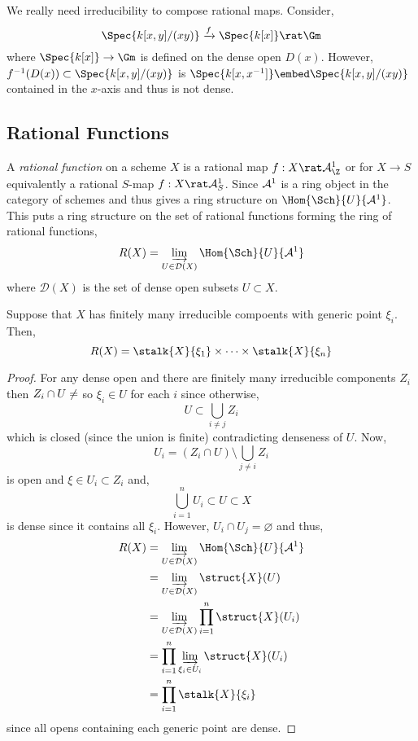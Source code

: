 \documentclass[12pt]{article}
\begin{document}
\begin{remark}
We really need irreducibility to compose rational maps. Consider,
\[ \Spec{k[x,y]/(xy)} \xrightarrow{f} \Spec{k[x]} \rat \Gm \]
where $\Spec{k[x]} \to \Gm$ is defined on the dense open $D(x)$. However, $f^{-1}(D(x)) \subset \Spec{k[x,y]/(xy)}$ is $\Spec{k[x, x^{-1}]} \embed \Spec{k[x,y]/(xy)}$ contained in the $x$-axis and thus is not dense.
\end{remark}

\subsection{Rational Functions}

\begin{definition}
A \textit{rational function} on a scheme $X$ is a rational map $f : X \rat \A^1_\Z$ or for $X \to S$ equivalently a rational $S$-map $f : X \rat \A^1_S$. Since $\mathcal{A}^1$ is a ring object in the category of schemes and thus gives a ring structure on $\Hom{\Sch}{U}{\A^1}$. This puts a ring structure on the set of rational functions forming the ring of rational functions,
\[ R(X) = \varinjlim_{U \in \mathcal{D}(X)} \Hom{\Sch}{U}{\A^1} \]
where $\mathcal{D}(X)$ is the set of dense open subsets $U \subset X$.
\end{definition}

\begin{prop}
Suppose that $X$ has finitely many irreducible compoents with generic point $\xi_i$. Then,
\[ R(X) = \stalk{X}{\xi_1} \times \cdots \times \stalk{X}{\xi_n} \]
\end{prop}

\begin{proof}
For any dense open and there are finitely many irreducible components $Z_i$ then $Z_i \cap U \neq \empty$ so $\xi_i \in U$ for each $i$ since otherwise,
\[ U \subset \bigcup_{i \neq j} Z_i \]
which is closed (since the union is finite) contradicting denseness of $U$. Now,
\[ U_i = (Z_i \cap U) \setminus \bigcup_{j \neq i} Z_i \]
is open and $\xi \in U_i \subset Z_i$ and,
\[ \bigcup_{i = 1}^n U_i \subset U \subset X \]
is dense since it contains all $\xi_i$. However, $U_i \cap U_j = \varnothing$ and thus,
\begin{align*}
R(X) & = \varinjlim_{U \in \mathcal{D}(X)} \Hom{\Sch}{U}{\A^1}
\\
& = \varinjlim_{U \in \mathcal{D}(X)} \struct{X}(U)
\\
& = \varinjlim_{U \in \mathcal{D}(X)} \prod_{i = 1}^n \struct{X}(U_i)
\\
& = \prod_{i = 1}^n \varinjlim_{\xi_i \in U_i} \struct{X}(U_i)
\\
& = \prod_{i = 1}^n \stalk{X}{\xi_i} 
\end{align*}
since all opens containing each generic point are dense.
\end{proof}
\end{document}
